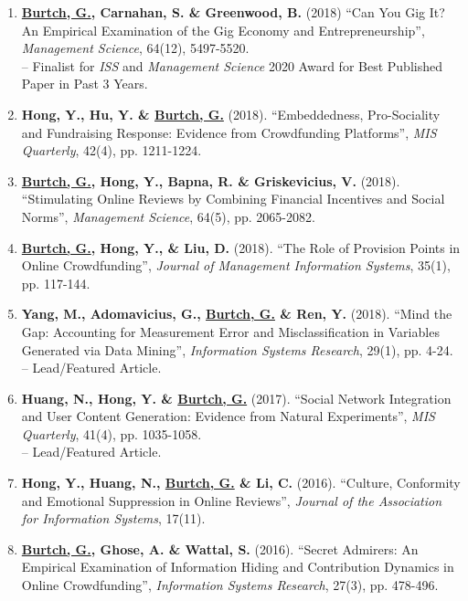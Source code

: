 \documentclass[10.5pt,letterpaper,sans]{moderncv}        %
\begin{document}
\begin{enumerate}[leftmargin=!,labelindent=5pt,itemindent=-15pt]
\item \textbf{\underline{Burtch, G.}, Carnahan, S. \& Greenwood, B.} (2018) ``Can You Gig It? An Empirical Examination of the Gig Economy and Entrepreneurship'', \textit{Management Science}, 64(12), 5497-5520. \\-- Finalist for \textit{ISS} and \textit{Management Science} 2020 Award for Best Published Paper in Past 3 Years.

\item \textbf{Hong, Y., Hu, Y. \& \underline{Burtch, G.}} (2018). ``Embeddedness, Pro-Sociality and Fundraising Response: Evidence from Crowdfunding Platforms'', \textit{MIS Quarterly}, 42(4), pp. 1211-1224.

\item \textbf{\underline{Burtch, G.}, Hong, Y., Bapna, R. \& Griskevicius, V.} (2018). ``Stimulating Online Reviews by Combining Financial Incentives and Social Norms'', \textit{Management Science}, 64(5), pp. 2065-2082.

\item \textbf{\underline{Burtch, G.}, Hong, Y., \& Liu, D.} (2018). ``The Role of Provision Points in Online Crowdfunding'', \textit{Journal of Management Information Systems}, 35(1), pp. 117-144.

\item \textbf{Yang, M., Adomavicius, G., \underline{Burtch, G.} \& Ren, Y.} (2018). ``Mind the Gap: Accounting for Measurement Error and Misclassification in Variables Generated via Data Mining'', \textit{Information Systems Research}, 29(1), pp. 4-24. \\-- Lead/Featured Article.

\item \textbf{Huang, N., Hong, Y. \& \underline{Burtch, G.}} (2017). ``Social Network Integration and User Content Generation: Evidence from Natural Experiments'', \textit{MIS Quarterly}, 41(4), pp. 1035-1058. \\-- Lead/Featured Article.

\item \textbf{Hong, Y., Huang, N., \underline{Burtch, G.} \& Li, C.} (2016). ``Culture, Conformity and Emotional Suppression in Online Reviews'', \textit{Journal of the Association for Information Systems}, 17(11).

\item \textbf{\underline{Burtch, G.}, Ghose, A. \& Wattal, S.} (2016). ``Secret Admirers: An Empirical Examination of Information Hiding and Contribution Dynamics in Online Crowdfunding'', \textit{Information Systems Research}, 27(3), pp. 478-496.


\end{enumerate}
\end{document}

